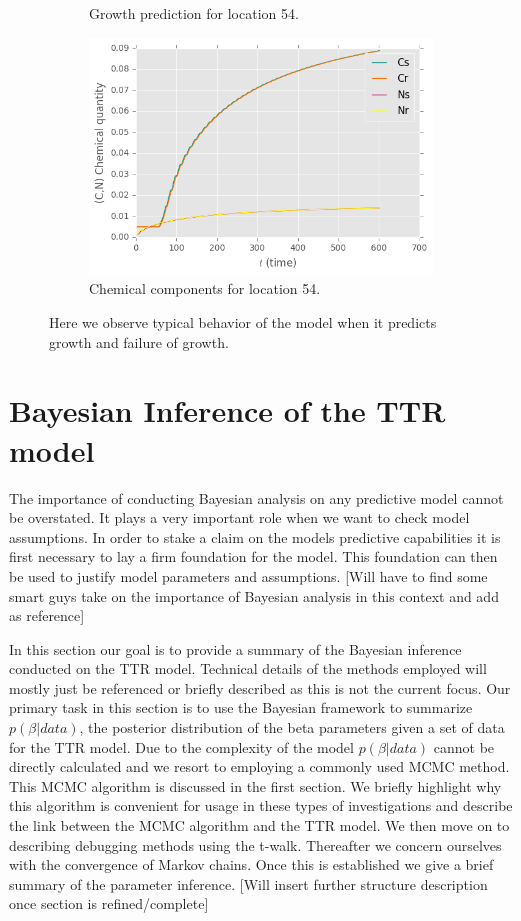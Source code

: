 \documentclass[paper=a4, fontsize=11pt]{scrartcl}
\numberwithin{equation}{section}		%
\numberwithin{figure}{section}			%
\numberwithin{table}{section}				%
\begin{document}
\begin{figure}[ht]
\begin{subfigure}{.5\textwidth}
\caption{Growth prediction for location 54.}
\label{loc-54-growth}
\end{subfigure}
\begin{subfigure}{.5\textwidth}
\includegraphics[scale=0.5]{loc-54-cc.png}
\caption{Chemical components for location 54. }
\label{loc-54-cc}
\end{subfigure}
\caption{Here we observe typical behavior of the model when it predicts growth and failure of growth.}
\label{loc-54}
\end{figure}


\section{Bayesian Inference of the TTR model}
The importance of conducting Bayesian analysis on any predictive model cannot be overstated. It plays a very important role when we want to check model assumptions. In order to stake a claim on the models predictive capabilities it is first necessary to lay a firm foundation for the model. This foundation can then be used to justify model parameters and assumptions.  [Will have to find some smart guys take on the importance of Bayesian analysis in this context and add as reference]

In this section our goal is to provide a summary of the Bayesian inference conducted on the TTR model. Technical details of the methods employed will mostly just be referenced or briefly described as this is not the current focus. Our primary task in this section is to use the Bayesian framework to summarize  $p(\beta|data)$, the posterior distribution of the beta parameters given a set of data for the TTR model. Due to the complexity of the model $p(\beta|data)$ cannot be directly calculated and we resort to employing a commonly used MCMC method. This MCMC algorithm is discussed in the first section. We briefly highlight why this algorithm is convenient for usage in these types of investigations and describe the link between the MCMC algorithm and the TTR model. We then move on to describing debugging methods using the t-walk. Thereafter we concern ourselves with the convergence of Markov chains. Once this is established we give a brief summary of the parameter inference. [Will insert further structure description once section is refined/complete]   
\end{document}

